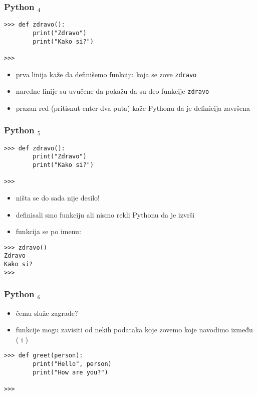 \documentclass[utf8,compress,aspectratio=169]{beamer}
\begin{document}
\begin{frame}[fragile]
\frametitle{Python $_4$}
\begin{verbatim}
>>> def zdravo():
        print("Zdravo")
        print("Kako si?")

>>>
\end{verbatim}
\begin{itemize}
  \item prva linija kaže da definišemo funkciju koja se zove \texttt{zdravo}
  \item naredne linije su uvučene da pokažu da su deo funkcije \texttt{zdravo}
  \item prazan red (pritisnut enter dva puta) kaže Pythonu da je definicija završena
\end{itemize}
\end{frame}

\begin{frame}[fragile]
\frametitle{Python $_5$}
\begin{verbatim}
>>> def zdravo():
        print("Zdravo")
        print("Kako si?")

>>>
\end{verbatim}
\begin{itemize}
  \item ništa se do sada nije desilo!
  \item definisali smo funkciju ali nismo rekli Pythonu da je izvrši
  \item funkcija se  po imenu:
\end{itemize}
\begin{verbatim}
>>> zdravo()
Zdravo
Kako si?
>>>
\end{verbatim}
\end{frame}

\begin{frame}[fragile]
\frametitle{Python $_6$}
\begin{itemize}
  \item čemu služe zagrade?
  \item funkcije mogu zavisiti od nekih podataka koje zovemo  koje navodimo između ( i )
\end{itemize}
\begin{verbatim}
>>> def greet(person):
        print("Hello", person)
        print("How are you?")

>>>
\end{verbatim}
\end{frame}
\end{document}
